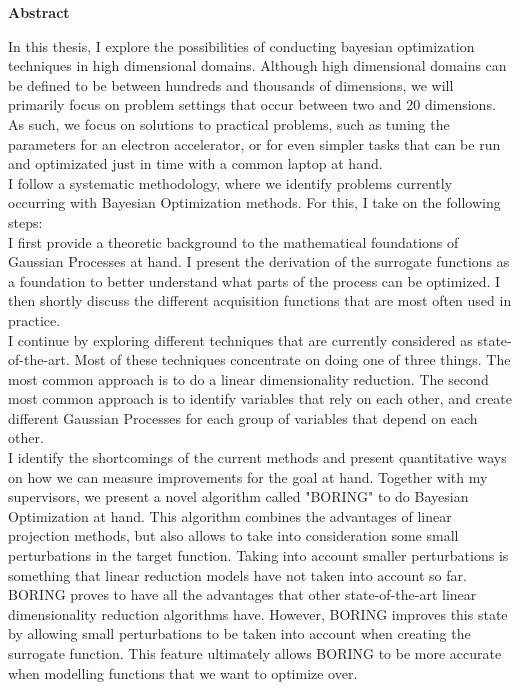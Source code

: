 \newpage
{\Huge \bf Abstract}
\vspace{24pt} 
\onehalfspacing


In this thesis, I explore the possibilities of conducting bayesian optimization techniques in high dimensional domains.
Although high dimensional domains can be defined to be between hundreds and thousands of dimensions, we will primarily focus on problem settings that occur between two and 20 dimensions.
As such, we focus on solutions to practical problems, such as tuning the parameters for an electron accelerator, or for even simpler tasks that can be run and optimizated just in time with a common laptop at hand. \\

I follow a systematic methodology, where we identify problems currently occurring with Bayesian Optimization methods.
For this, I take on the following steps: \\

I first provide a theoretic background to the mathematical foundations of Gaussian Processes at hand.
I present the derivation of the surrogate functions as a foundation to better understand what parts of the process can be optimized.
I then shortly discuss the different acquisition functions that are most often used in practice.\\

I continue by exploring different techniques that are currently considered as state-of-the-art. 
Most of these techniques concentrate on doing one of three things.
The most common approach is to do a linear dimensionality reduction.
The second most common approach is to identify variables that rely on each other, and create different Gaussian Processes for each group of variables that depend on each other. \\

I identify the shortcomings of the current methods and present quantitative ways on how we can measure improvements for the goal at hand.
Together with my supervisors, we present a novel algorithm called "BORING" to do Bayesian Optimization at hand.
This algorithm combines the advantages of linear projection methods, but also allows to take into consideration some small perturbations in the target function.
Taking into account smaller perturbations is something that linear reduction models have not taken into account so far.
BORING proves to have all the advantages that other state-of-the-art linear dimensionality reduction algorithms have.
However, BORING improves this state by allowing small perturbations to be taken into account when creating the surrogate function. 
This feature ultimately allows BORING to be more accurate when modelling functions that we want to optimize over. \\

